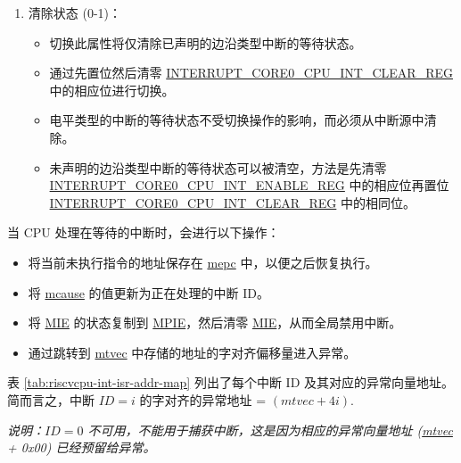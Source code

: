 \documentclass[main\_\_CN.tex]{subfiles}
\begin{document}
\begin{enumerate}
\begin{itemize}
        \item 所有在等待的中断都为“未声明”。
    \end{itemize}
    \item 清除状态 (0-1)：
    \begin{itemize}
        \item 切换此属性将仅清除已声明的边沿类型中断的等待状态。
        \item 通过先置位然后清零 \hyperref[regdesc:INTERRUPTCORE0CPUINTCLEARREG]{INTERRUPT\_CORE0\_CPU\_INT\_CLEAR\_REG} 中的相应位进行切换。
        \item 电平类型的中断的等待状态不受切换操作的影响，而必须从中断源中清除。
        \item 未声明的边沿类型中断的等待状态可以被清空，方法是先清零 \hyperref[regdesc:INTERRUPTCORE0CPUINTENABLEREG]{INTERRUPT\_CORE0\_CPU\_INT\_ENABLE\_REG} 中的相应位再置位 \hyperref[regdesc:INTERRUPTCORE0CPUINTCLEARREG]{INTERRUPT\_CORE0\_CPU\_INT\_CLEAR\_REG} 中的相同位。
    \end{itemize}
\end{enumerate}

当 CPU 处理在等待的中断时，会进行以下操作：
\begin{itemize}
    \item 将当前未执行指令的地址保存在 \hyperref[regdesc:MEPC]{mepc} 中，以便之后恢复执行。
    \item 将 \hyperref[regdesc:MCAUSE]{mcause} 的值更新为正在处理的中断 ID。
    \item 将 \hyperref[fielddesc:MSTATUSMIE]{MIE} 的状态复制到 \hyperref[fielddesc:MSTATUSMPIE]{MPIE}，然后清零 \hyperref[fielddesc:MSTATUSMIE]{MIE}，从而全局禁用中断。
    \item 通过跳转到 \hyperref[regdesc:MTVEC]{mtvec} 中存储的地址的字对齐偏移量进入异常。
\end{itemize}

表 \ref{tab:riscvcpu-int-isr-addr-map} 列出了每个中断 ID 及其对应的异常向量地址。简而言之，中断 $ID=i$ 的字对齐的异常地址 = $(\hyperref[fielddesc:MTVECBASE]{mtvec} + 4i)$.

 \textit{说明：$ID=0$ 不可用，不能用于捕获中断，这是因为相应的异常向量地址 (\hyperref[fielddesc:MTVECBASE]{mtvec} + 0x00) 已经预留给异常。}
\end{document}
